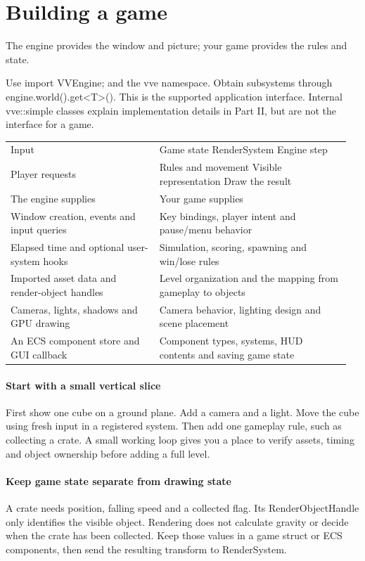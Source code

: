 \documentclass[11pt,a4paper]{article}
\begin{document}
\clearpage\part{Building a game}
\label{core-52}
The engine provides the window and picture; your game provides the rules and state.

Use import VVEngine; and the vve namespace. Obtain subsystems through engine.world().get<T>(). This is the supported application interface. Internal vve::simple classes explain implementation details in Part II, but are not the interface for a game.

{\small
\begin{longtable}{@{}p{0.42\linewidth}p{0.54\linewidth}@{}}
Input & Game state               RenderSystem                  Engine step \\
Player requests & Rules and movement       Visible representation           Draw the result \\
The engine supplies & Your game supplies \\
Window creation, events and input queries & Key bindings, player intent and pause/menu behavior \\
Elapsed time and optional user-system hooks & Simulation, scoring, spawning and win/lose rules \\
Imported asset data and render-object handles & Level organization and the mapping from gameplay to objects \\
Cameras, lights, shadows and GPU drawing & Camera behavior, lighting design and scene placement \\
An ECS component store and GUI callback & Component types, systems, HUD contents and saving game state \\
\end{longtable}
}

\subsection*{Start with a small vertical slice}
First show one cube on a ground plane. Add a camera and a light. Move the cube using fresh input in a registered system. Then add one gameplay rule, such as collecting a crate. A small working loop gives you a place to verify assets, timing and object ownership before adding a full level.

\subsection*{Keep game state separate from drawing state}
A crate needs position, falling speed and a collected flag. Its RenderObjectHandle only identifies the visible object. Rendering does not calculate gravity or decide when the crate has been collected. Keep those values in a game struct or ECS components, then send the resulting transform to RenderSystem.
\end{document}
